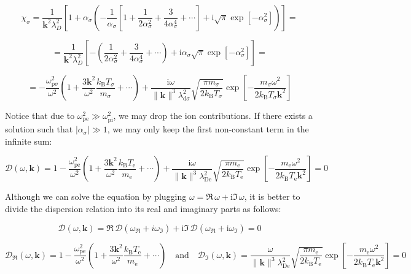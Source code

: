 \begin{equation}
    \chi_\sigma=\frac{1}{\mathbf{k}^2\lambda_D^2}\left[1+\alpha_\sigma\left(-\frac{1}{\alpha_\sigma}\left[1+\frac{1}{2\alpha_\sigma^2}+\frac{3}{4\alpha_\sigma^4}+\cdots\right]+\mathrm{i}\sqrt{\pi}\exp{[-\alpha_\sigma^2]}\right)\right]=
\end{equation}

\begin{equation}
    =\frac{1}{\mathbf{k}^2\lambda_D^2}\left[-\left(\frac{1}{2\alpha_\sigma^2}+\frac{3}{4\alpha_\sigma^4}+\cdots\right)+\mathrm{i}\alpha_\sigma\sqrt{\pi}\exp{[-\alpha_\sigma^2]}\right]=
\end{equation}

\begin{equation}
    =-\frac{\omega_{\mathrm{p}\sigma}^2}{\omega^2}\left(1+\frac{3\mathbf{k}^2}{\omega^2}\frac{k_\mathrm{B}T_\sigma}{m_\sigma}+\cdots\right)+\frac{\mathrm{i}\omega}{\|\mathbf{k}\|^3\lambda_{\mathrm{d}\sigma}^2}\sqrt{\frac{\pi m_\sigma}{2k_\mathrm{B}T_\sigma}}\exp{\left[-\frac{m_\sigma\omega^2}{2k_\mathrm{B}T_\sigma\mathbf{k}^2}\right]}
\end{equation}


Notice that due to $\omega_{\text{pe}}^2\gg\omega_{\text{pi}}^2$, we may drop the ion contributions. If there exists a solution such that $|\alpha_\sigma|\gg1$, we may only keep the first non-constant term in the infinite sum:

\begin{equation}
    \mathcal{D}(\omega,\mathbf{k})=1-\frac{\omega_\text{pe}^2}{\omega^2}\left(1+\frac{3\mathbf{k}^2}{\omega^2}\frac{k_\mathrm{B}T_\text{e}}{m_\text{e}}+\cdots\right)+\frac{\mathrm{i}\omega}{\|\mathbf{k}\|^3\lambda_{\text{De}}^2}\sqrt{\frac{\pi m_\text{e}}{2k_\mathrm{B}T_\text{e}}}\exp{\left[-\frac{m_\text{e}\omega^2}{2k_\mathrm{B}T_\text{e}\mathbf{k}^2}\right]}=0
\end{equation}

Although we can solve the equation by plugging $\omega=\Re\,\omega+\mathrm{i}\Im\,\omega$, it is better to divide the dispersion relation into its real and imaginary parts as follows:

\begin{equation}
    \mathcal{D}(\omega,\mathbf{k})=\Re\,\mathcal{D}(\omega_\Re+i\omega_\Im)+\mathrm{i}\Im\,\mathcal{D}(\omega_\Re+\mathrm{i}\omega_\Im)=0
\end{equation}

\begin{equation}
    \mathcal{D}_\Re(\omega,\mathbf{k})=1-\frac{\omega_\text{pe}^2}{\omega^2}\left(1+\frac{3\mathbf{k}^2}{\omega^2}\frac{k_\mathrm{B}T_\text{e}}{m_\text{e}}+\cdots\right)\quad\text{and}\quad \mathcal{D}_\Im(\omega,\mathbf{k})=\frac{\omega}{\|\mathbf{k}\|^3\lambda_{\text{De}}^2}\sqrt{\frac{\pi m_\text{e}}{2k_\mathrm{B}T_\text{e}}}\exp{\left[-\frac{m_\text{e}\omega^2}{2k_\mathrm{B}T_\text{e}\mathbf{k}^2}\right]}=0
\end{equation}

